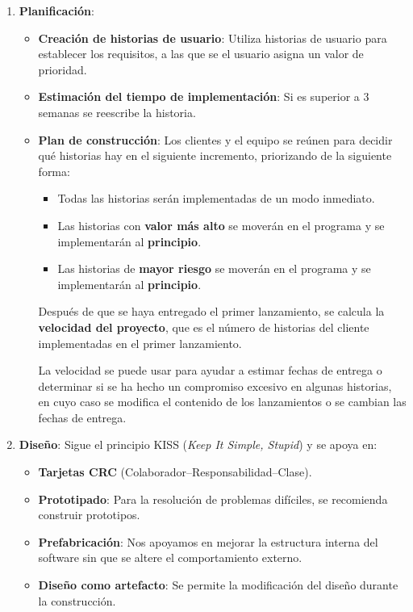 \begin{enumerate}

    \item \textbf{Planificación}:
    \begin{itemize}

       \item \textbf{Creación de historias de usuario}: Utiliza historias de usuario para establecer los requisitos, a las que se el usuario asigna un valor de prioridad.
       \item \textbf{Estimación del tiempo de implementación}: Si es superior a 3 semanas se reescribe la historia.
       
       \item \textbf{Plan de construcción}: Los clientes y el equipo se reúnen para decidir qué historias hay en el siguiente incremento, priorizando de la siguiente forma:
       \begin{itemize}
          \item Todas las historias serán implementadas de un modo inmediato.
          \item Las historias con \textbf{valor más alto} se moverán en el programa y se implementarán al \textbf{principio}.
          \item Las historias de \textbf{mayor riesgo} se moverán en el programa y se implementarán al \textbf{principio}.
       \end{itemize}
       Después de que se haya entregado el primer lanzamiento, se calcula la \textbf{velocidad del proyecto}, que es el número de historias del cliente implementadas en el primer lanzamiento. 
       
       La velocidad se puede usar para ayudar a estimar fechas de entrega o determinar si se ha hecho un compromiso excesivo en algunas historias, en cuyo caso se modifica el contenido de los lanzamientos o se cambian las fechas de entrega.
          
    \end{itemize}
    
    
   \item \textbf{Diseño}: Sigue el principio KISS (\textit{Keep It Simple, Stupid}) y se apoya en: 
   \begin{itemize} %
      \item \textbf{Tarjetas CRC} (Colaborador--Responsabilidad--Clase). 
      \item \textbf{Prototipado}: Para la resolución de problemas difíciles, se recomienda construir prototipos.
      \item \textbf{Prefabricación}: Nos apoyamos en mejorar la estructura interna del software sin que se altere el comportamiento externo.
      \item \textbf{Diseño como artefacto}: Se permite la modificación del diseño durante la construcción.
   \end{itemize}


\end{enumerate}
